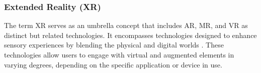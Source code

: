 
\subsubsection{Extended Reality (\ac{XR})}
    The term \ac{XR} serves as an umbrella concept that includes \ac{AR}, \ac{MR}, and \ac{VR} as distinct but related technologies. It encompasses technologies designed to enhance sensory experiences by blending the physical and digital worlds \cite{pesca2021augmented}. These technologies allow users to engage with virtual and augmented elements in varying degrees, depending on the specific application or device in use.


